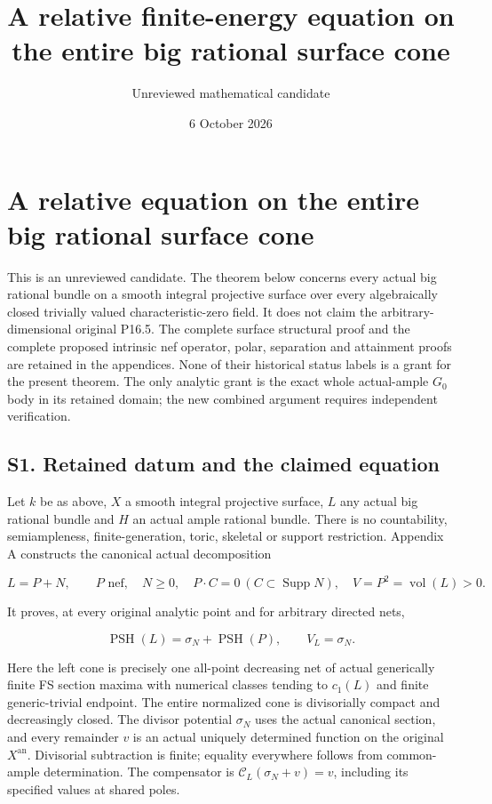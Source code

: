 \documentclass[
  10pt,
]{article}
\title{A relative finite-energy equation on the entire big rational
surface cone}
\author{Unreviewed mathematical candidate}
\date{6 October 2026}
\begin{document}
\maketitle

\section{A relative equation on the entire big rational surface
cone}\label{a-relative-equation-on-the-entire-big-rational-surface-cone}

This is an unreviewed candidate. The theorem below concerns every actual
big rational bundle on a smooth integral projective surface over every
algebraically closed trivially valued characteristic-zero field. It does
not claim the arbitrary-dimensional original P16.5. The complete surface
structural proof and the complete proposed intrinsic nef operator,
polar, separation and attainment proofs are retained in the appendices.
None of their historical status labels is a grant for the present
theorem. The only analytic grant is the exact whole actual-ample \(G_0\)
body in its retained domain; the new combined argument requires
independent verification.

\subsection{S1. Retained datum and the claimed
equation}\label{s1.-retained-datum-and-the-claimed-equation}

Let \(k\) be as above, \(X\) a smooth integral projective surface, \(L\)
any actual big rational bundle and \(H\) an actual ample rational
bundle. There is no countability, semiampleness, finite-generation,
toric, skeletal or support restriction. Appendix A constructs the
canonical actual decomposition

\[L=P+N,\qquad P\text{ nef},\quad N\geq0,\quad P\cdot C=0\ (C\subset\operatorname{Supp}N),\quad V=P^2=\operatorname{vol}(L)>0.\]

It proves, at every original analytic point and for arbitrary directed
nets,

\[\operatorname{PSH}(L)=\sigma_N+\operatorname{PSH}(P),\qquad V_L=\sigma_N.\]

Here the left cone is precisely one all-point decreasing net of actual
generically finite FS section maxima with numerical classes tending to
\(c_1(L)\) and finite generic-trivial endpoint. The entire normalized
cone is divisorially compact and decreasingly closed. The divisor
potential \(\sigma_N\) uses the actual canonical section, and every
remainder \(v\) is an actual uniquely determined function on the
original \(X^{\mathrm{an}}\). Divisorial subtraction is finite; equality
everywhere follows from common-ample determination. The compensator is
\(\mathcal C_L(\sigma_N+v)=v\), including its specified values at shared
poles.
\end{document}
